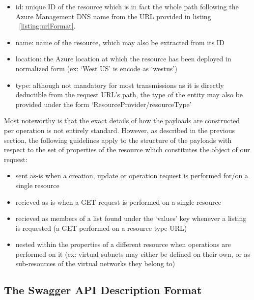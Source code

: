 \documentclass[11pt]{report}
\begin{document}
\begin{itemize}
    \item{id}: unique ID of the resource which is in fact the whole path
        following the Azure Management DNS name from the URL provided in
        listing ~\ref{listing:urlFormat}.
    \item{name}: name of the resource, which may also be extracted from its ID
    \item{location}: the Azure location at which the resource has been
        deployed in normalized form (ex: `West US' is encode as `westus')
    \item{type}: although not mandatory for most transmissions as it is
        directly deductible from the request URL's path, the type of the
        entity may also be provided under the form
        `ResourceProvider/resourceType'
\end{itemize}

Most noteworthy is that the exact details of how the payloads are constructed
per operation is not entirely standard. However, as described in the previous
section, the following guidelines apply to the structure of the payloads with
respect to the set of properties of the resource which constitutes the object
of our request:

\begin{itemize}
    \item{} sent as-is when a creation, update or operation request is
        performed for/on a single resource
    \item{} recieved as-is when a GET request is performed on a single
        resource
    \item{} recieved as members of a list found under the `values' key
        whenever a listing is requested (a GET performed on a resource type URL)
    \item{} nested within the properties of a different resource when
        operations are performed on it (ex: virtual subnets may either
        be defined on their own, or as sub-resources of the virtual networks
        they belong to)
\end{itemize}

\subsection{The Swagger API Description Format}
\end{document}
